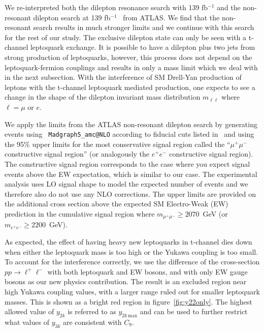 \documentclass[12pt]{revtex4-2}
\numberwithin{equation}{section}
\begin{document}
We re-interpreted both the dilepton resonance search with 139 fb$^{-1}$  \cite{ATLAS:2019erb} and the non-resonant dilepton search at 139 fb$^{-1}$~\cite{ATLAS:2020yat} from ATLAS.  We find that the non-resonant search results in much stronger limits and we continue with this search for the rest of our study. The exclusive dilepton state can only be seen with a t-channel leptoquark exchange.  It is possible to have a dilepton plus two jets from strong production of leptoquarks, however, this process does not depend on the leptoquark-fermion couplings and results in only a mass limit which we deal with in the next subsection.  With the interference of SM Drell-Yan production of leptons with the t-channel leptoquark mediated production, one expects to see a change in the shape of the dilepton invariant mass distribution $m_{\ell \ell}$ where $\ell = \mu$ or $e$.  

We apply the limits from the ATLAS non-resonant dilepton search by generating events using \texttt{ Madgraph5\_amc@NLO} according to fiducial cuts listed in~\cite{ATLAS:2020yat} and using the 95\% upper limits for the most conservative signal region called the ``$\mu^+ \mu^-$ constructive signal region'' (or analogously the $e^+ e^-$ constructive signal region).  The constructive signal region corresponds to the case where you expect signal events above the EW expectation, which is similar to our case.  The experimental analysis uses LO signal shape to model the expected number of events and we therefore also do not use any NLO corrections.  The upper limits are provided on the additional cross section above the expected SM Electro-Weak (EW) prediction in the cumulative signal region where $m_{\mu^+ \mu^-} \geq 2070$~GeV (or $m_{e^+ e^-} \geq 2200$~GeV).  

As expected, the effect of having heavy new leptoquarks in t-channel dies down when either the leptoquark mass is too high or the Yukawa coupling is too small.  To account for the interference correctly, we use the difference of the cross-section $pp \rightarrow \ell^+ \ell^-$ with both leptoquark and EW bosons, and with only EW gauge bosons as our new physics contribution.  The result is an excluded region near high Yukawa coupling values, with a larger range ruled out for smaller leptoquark masses.  This is shown as a bright red region in figure~\ref{fig:y22only}.  The highest allowed value of $y_{2k}$ is referred to as $y_{2k\,\mathrm{max}}$ and can be used to further restrict what values of $y_{3k}$ are consistent with $C_9$.
\end{document}
